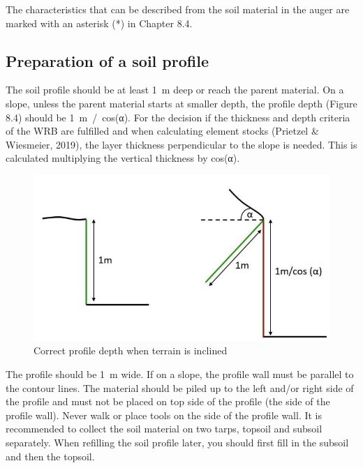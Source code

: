 \documentclass[
  letterpaper,
  DIV=11,
  numbers=noendperiod]{scrreprt}
\begin{document}
The characteristics that can be described from the soil material in the
auger are marked with an asterisk (*) in Chapter 8.4.

\hypertarget{preparation-of-a-soil-profile}{%
\subsection{Preparation of a soil
profile}\label{preparation-of-a-soil-profile}}

The soil profile should be at least 1~m deep or reach the parent
material. On a slope, unless the parent material starts at smaller
depth, the profile depth (Figure 8.4) should be 1~m~/~cos(α). For the
decision if the thickness and depth criteria of the WRB are fulfilled
and when calculating element stocks (Prietzel \& Wiesmeier, 2019), the
layer thickness perpendicular to the slope is needed. This is calculated
multiplying the vertical thickness by cos(α).

\begin{figure}

{\centering \includegraphics{./figure_8-4.png}

}

\caption{Correct profile depth when terrain is inclined}

\end{figure}

The profile should be 1~m wide. If on a slope, the profile wall must be
parallel to the contour lines. The material should be piled up to the
left and/or right side of the profile and must not be placed on top side
of the profile (the side of the profile wall). Never walk or place tools
on the side of the profile wall. It is recommended to collect the soil
material on two tarps, topsoil and subsoil separately. When refilling
the soil profile later, you should first fill in the subsoil and then
the topsoil.
\end{document}
